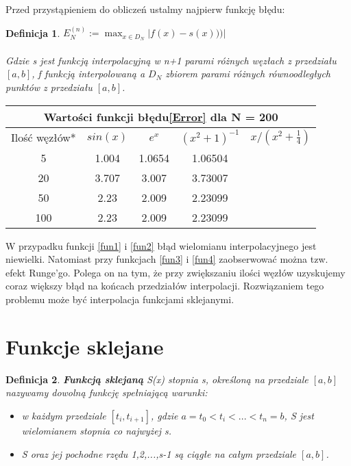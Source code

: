 \documentclass{article}
\newtheorem{defi}{Definicja}
\begin{document}
Przed przystąpieniem do obliczeń ustalmy najpierw funkcję błędu:
\begin{defi}\label{Error}
	$E_N^{(n)} := \max_{x \in D_N}|f(x)-s(x)))|$ \\
	\\
	Gdzie s jest funkcją interpolacyjną w n+1 parami różnych węzłach z przedziału $[a,b]$, f funkcją interpolowaną a $D_N$ zbiorem parami różnych równoodległych punktów z przedziału $[a,b]$.
\end{defi}

\renewcommand{\arraystretch}{1.5}  %
\begin{center}
	\begin{tabular}{||c||c|c|c|c||} \hline
		\multicolumn{5}{||c||}{Wartości funkcji błędu\eqref{Error} dla N = 200  } \\ \hline
		Ilość węzłów* & $sin(x)$ & $e^x$ & $(x^{2}+1)^{-1}$ & $x/(x^{2} + \frac{1}{4})$ \\ \hline
		5 &  1.004 &  1.0654 &  1.06504 & \\
		\hline
		20 &  3.707 &  3.007 &  3.73007 & \\
		\hline
		50 &  2.23 &  2.009 &  2.23099 & \\
		\hline
		100 &  2.23 &  2.009 &  2.23099 & \\
		\hline
	\end{tabular}
\end{center}
\renewcommand{\arraystretch}{1}

W przypadku funkcji \eqref{fun1} i \eqref{fun2} błąd wielomianu interpolacyjnego jest niewielki. Natomiast przy funkcjach \eqref{fun3} i \eqref{fun4} zaobserwować można tzw. efekt Runge'go\cite{runge}. Polega on na tym, że przy zwiększaniu ilości węzłów uzyskujemy coraz większy błąd na końcach przedziałów interpolacji. Rozwiązaniem tego problemu może być interpolacja funkcjami sklejanymi.


\section{Funkcje sklejane}


\begin{defi}
	\textbf{Funkcją sklejaną} S(x) stopnia s, określoną na przedziale $[a,b]$ nazywamy dowolną funkcję spełniającą warunki:
	
	\begin{itemize}
		\item w każdym przedziale $[t_i,t_{i+1}]$, gdzie $a = t_0 < t_i <...<t_n = b$, S jest wielomianem stopnia co najwyżej s.
		\item S oraz jej pochodne rzędu 1,2,...,s-1 są ciągłe na całym przedziale $[a,b]$.
	\end{itemize}
\end{defi}
\end{document}
